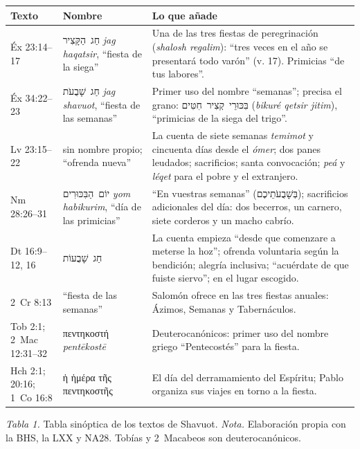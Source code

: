 \documentclass[11pt,letterpaper]{article}
\newcommand{\heb}[1]{\mbox{\foreignlanguage{hebrew}{#1}}}
\newcommand{\grc}[1]{\foreignlanguage{ancientgreek}{#1}}
\begin{document}
\begin{center}\small\renewcommand{\arraystretch}{1.22}
\begin{tabular}{@{}L{2.2cm}L{3.6cm}L{9.6cm}@{}}
\toprule
\textbf{Texto} & \textbf{Nombre} & \textbf{Lo que añade} \\ \midrule
Éx 23:14--17 & \heb{חַג הַקָּצִיר} \emph{jag haqatsir}, ``fiesta de la siega'' & Una de las tres fiestas de peregrinación (\emph{shalosh regalim}): ``tres veces en el año se presentará todo varón'' (v. 17). Primicias ``de tus labores''. \\
Éx 34:22--23 & \heb{חַג שָׁבֻעֹת} \emph{jag shavuot}, ``fiesta de las semanas'' & Primer uso del nombre ``semanas''; precisa el grano: \heb{בִּכּוּרֵי קְצִיר חִטִּים} (\emph{bikuré qetsir jitim}), ``primicias de la siega del trigo''. \\
Lv 23:15--22 & sin nombre propio; ``ofrenda nueva'' & La cuenta de siete semanas \emph{temimot} y cincuenta días desde el \emph{ómer}; dos panes leudados; sacrificios; santa convocación; \emph{peá} y \emph{léqet} para el pobre y el extranjero. \\
Nm 28:26--31 & \heb{יוֹם הַבִּכּוּרִים} \emph{yom habikurim}, ``día de las primicias'' & ``En vuestras semanas'' (\heb{בְּשָׁבֻעֹתֵיכֶם}); sacrificios adicionales del día: dos becerros, un carnero, siete corderos y un macho cabrío. \\
Dt 16:9--12, 16 & \heb{חַג שָׁבֻעוֹת} & La cuenta empieza ``desde que comenzare a meterse la hoz''; ofrenda voluntaria según la bendición; alegría inclusiva; ``acuérdate de que fuiste siervo''; en el lugar escogido. \\
2~Cr 8:13 & ``fiesta de las semanas'' & Salomón ofrece en las tres fiestas anuales: Ázimos, Semanas y Tabernáculos. \\
Tob 2:1; 2~Mac 12:31--32 & \grc{πεντηκοστή} \emph{pentēkostē} & Deuterocanónicos: primer uso del nombre griego ``Pentecostés'' para la fiesta. \\
Hch 2:1; 20:16; 1~Co 16:8 & \grc{ἡ ἡμέρα τῆς πεντηκοστῆς} & El día del derramamiento del Espíritu; Pablo organiza sus viajes en torno a la fiesta. \\
\bottomrule
\end{tabular}\par
{\footnotesize\color{sepia}\textit{Tabla 1.} Tabla sinóptica de los textos de Shavuot. \textit{Nota.} Elaboración propia con la BHS, la LXX y NA28. Tobías y 2~Macabeos son deuterocanónicos.}
\end{center}
\end{document}
